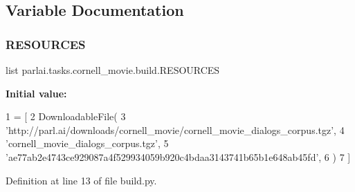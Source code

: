 \subsection{Variable Documentation}
\mbox{\label{namespaceparlai_1_1tasks_1_1cornell__movie_1_1build_a3ebe7bd780f6364ef3d5a12e120738cb}} 
\subsubsection{\texorpdfstring{R\+E\+S\+O\+U\+R\+C\+ES}{RESOURCES}}
{\footnotesize\ttfamily list parlai.\+tasks.\+cornell\+\_\+movie.\+build.\+R\+E\+S\+O\+U\+R\+C\+ES}

{\bfseries Initial value\+:}
\begin{DoxyCode}
1 =  [
2     DownloadableFile(
3         \textcolor{stringliteral}{'http://parl.ai/downloads/cornell\_movie/cornell\_movie\_dialogs\_corpus.tgz'},
4         \textcolor{stringliteral}{'cornell\_movie\_dialogs\_corpus.tgz'},
5         \textcolor{stringliteral}{'ae77ab2e4743ce929087a4f529934059b920c4bdaa3143741b65b1e648ab45fd'},
6     )
7 ]
\end{DoxyCode}


Definition at line 13 of file build.\+py.

